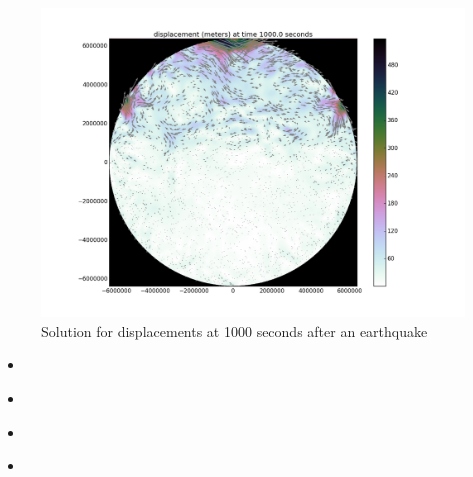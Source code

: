 \documentclass[12pt]{article}
\newcommand{\pythonscript}[2]{\begin{itemize}
                              \item[]
                              \end{itemize}}
\begin{document}
\begin{figure}
\includegraphics[scale=0.4]{figures/1000s}
\centering
\caption{Solution for displacements at 1000 seconds after an earthquake}
\end{figure}

\break
\pythonscript{scripts/SeisRBF}{SeisRBF.py} 
\pythonscript{scripts/radial}{radial.py} 
\pythonscript{scripts/halton}{halton.py} 
\pythonscript{scripts/usrfcn}{usrfcn.py} 
\end{document}
